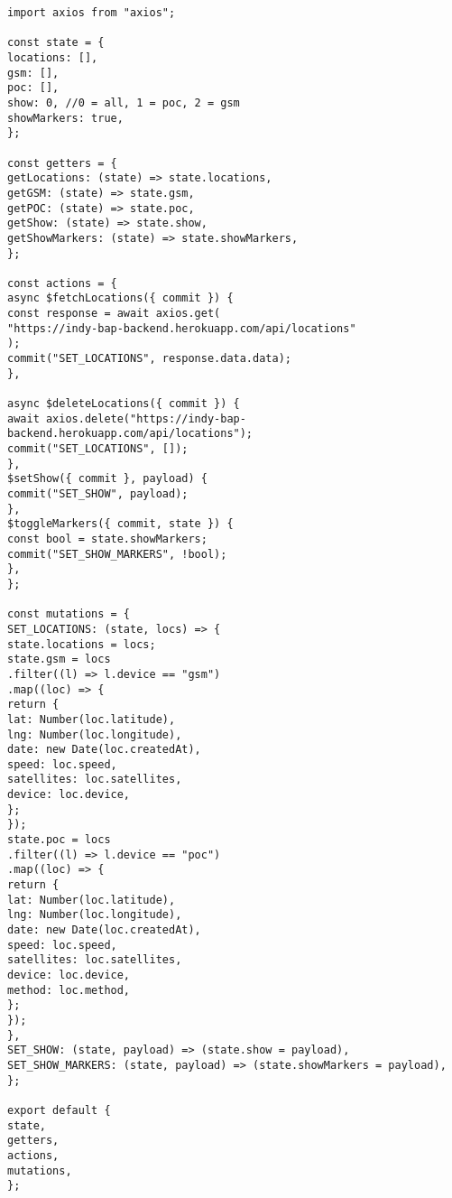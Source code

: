 \begin{lstlisting}
import axios from "axios";

const state = {
locations: [],
gsm: [],
poc: [],
show: 0, //0 = all, 1 = poc, 2 = gsm
showMarkers: true,
};

const getters = {
getLocations: (state) => state.locations,
getGSM: (state) => state.gsm,
getPOC: (state) => state.poc,
getShow: (state) => state.show,
getShowMarkers: (state) => state.showMarkers,
};

const actions = {
async $fetchLocations({ commit }) {
const response = await axios.get(
"https://indy-bap-backend.herokuapp.com/api/locations"
);
commit("SET_LOCATIONS", response.data.data);
},

async $deleteLocations({ commit }) {
await axios.delete("https://indy-bap-backend.herokuapp.com/api/locations");
commit("SET_LOCATIONS", []);
},
$setShow({ commit }, payload) {
commit("SET_SHOW", payload);
},
$toggleMarkers({ commit, state }) {
const bool = state.showMarkers;
commit("SET_SHOW_MARKERS", !bool);
},
};

const mutations = {
SET_LOCATIONS: (state, locs) => {
state.locations = locs;
state.gsm = locs
.filter((l) => l.device == "gsm")
.map((loc) => {
return {
lat: Number(loc.latitude),
lng: Number(loc.longitude),
date: new Date(loc.createdAt),
speed: loc.speed,
satellites: loc.satellites,
device: loc.device,
};
});
state.poc = locs
.filter((l) => l.device == "poc")
.map((loc) => {
return {
lat: Number(loc.latitude),
lng: Number(loc.longitude),
date: new Date(loc.createdAt),
speed: loc.speed,
satellites: loc.satellites,
device: loc.device,
method: loc.method,
};
});
},
SET_SHOW: (state, payload) => (state.show = payload),
SET_SHOW_MARKERS: (state, payload) => (state.showMarkers = payload),
};

export default {
state,
getters,
actions,
mutations,
};
\end{lstlisting}